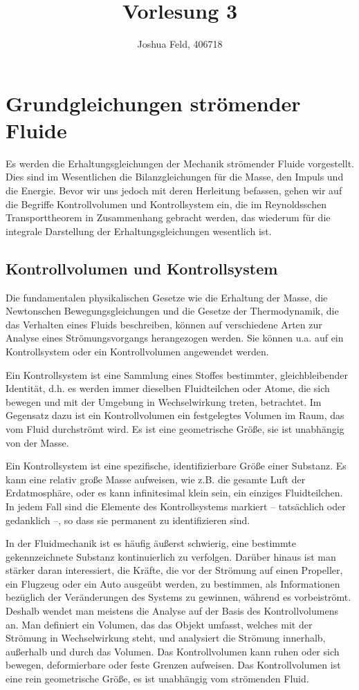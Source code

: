 \documentclass{lecture}
\institute{Lehrstuhl für Strömungslehre und Aerodynamisches Institut}
\title{Vorlesung 3}
\author{Joshua Feld, 406718}
\begin{document}
    \maketitle


    \section*{Grundgleichungen strömender Fluide}

    Es werden die Erhaltungsgleichungen der Mechanik strömender Fluide vorgestellt.
    Dies sind im Wesentlichen die Bilanzgleichungen für die Masse, den Impuls und die Energie.
    Bevor wir uns jedoch mit deren Herleitung befassen, gehen wir auf die Begriffe Kontrollvolumen und Kontrollsystem ein, die im Reynoldsschen Transporttheorem in Zusammenhang gebracht werden, das wiederum für die integrale Darstellung der Erhaltungsgleichungen wesentlich ist.


    \subsection*{Kontrollvolumen und Kontrollsystem}

    Die fundamentalen physikalischen Gesetze wie die Erhaltung der Masse, die Newtonschen Bewegungsgleichungen und die Gesetze der Thermodynamik, die das Verhalten eines Fluids beschreiben, können auf verschiedene Arten zur Analyse eines Strömungsvorgangs herangezogen werden.
    Sie können u.a. auf ein Kontrollsystem oder ein Kontrollvolumen angewendet werden.

    Ein Kontrollsystem ist eine Sammlung eines Stoffes bestimmter, gleichbleibender Identität, d.h. es werden immer dieselben Fluidteilchen oder Atome, die sich bewegen und mit der Umgebung in Wechselwirkung treten, betrachtet.
    Im Gegensatz dazu ist ein Kontrollvolumen ein festgelegtes Volumen im Raum, das vom Fluid durchströmt wird.
    Es ist eine geometrische Größe, sie ist unabhängig von der Masse.

    Ein Kontrollsystem ist eine spezifische, identifizierbare Größe einer Substanz.
    Es kann eine relativ große Masse aufweisen, wie z.B. die gesamte Luft der Erdatmosphäre, oder es kann infinitesimal klein sein, ein einziges Fluidteilchen.
    In jedem Fall sind die Elemente des Kontrollsystems markiert -- tatsächlich oder gedanklich --, so dass sie permanent zu identifizieren sind.

    In der Fluidmechanik ist es häufig äußerst schwierig, eine bestimmte gekennzeichnete Substanz kontinuierlich zu verfolgen.
    Darüber hinaus ist man stärker daran interessiert, die Kräfte, die vor der Strömung auf einen Propeller, ein Flugzeug oder ein Auto ausgeübt werden, zu bestimmen, als Informationen bezüglich der Veränderungen des Systems zu gewinnen, während es vorbeiströmt.
    Deshalb wendet man meistens die Analyse auf der Basis des Kontrollvolumens an.
    Man definiert ein Volumen, das das Objekt umfasst, welches mit der Strömung in Wechselwirkung steht, und analysiert die Strömung innerhalb, außerhalb und durch das Volumen.
    Das Kontrollvolumen kann ruhen oder sich bewegen, deformierbare oder feste Grenzen aufweisen.
    Das Kontrollvolumen ist eine rein geometrische Größe, es ist unabhängig vom strömenden Fluid.
\end{document}

